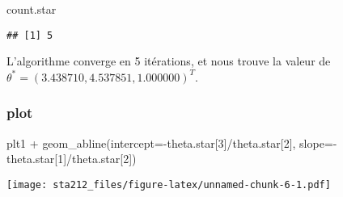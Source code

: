 \documentclass[
]{article}
\newenvironment{Shaded}{\begin{snugshade}}{\end{snugshade}}
\newcommand{\AttributeTok}[1]{\textcolor[rgb]{0.77,0.63,0.00}{#1}}
\newcommand{\DecValTok}[1]{\textcolor[rgb]{0.00,0.00,0.81}{#1}}
\newcommand{\FunctionTok}[1]{\textcolor[rgb]{0.00,0.00,0.00}{#1}}
\newcommand{\NormalTok}[1]{#1}
\newcommand{\SpecialCharTok}[1]{\textcolor[rgb]{0.00,0.00,0.00}{#1}}
\begin{document}
\begin{Shaded}
\begin{Highlighting}[]
\NormalTok{count.star}
\end{Highlighting}
\end{Shaded}

\begin{verbatim}
## [1] 5
\end{verbatim}

L'algorithme converge en 5 itérations, et nous trouve la valeur de
\(\theta^* = (3.438710, 4.537851, 1.000000)^T\).

\hypertarget{plot}{%
\subsubsection{plot}\label{plot}}

\begin{Shaded}
\begin{Highlighting}[]
\NormalTok{plt1 }\SpecialCharTok{+} \FunctionTok{geom\_abline}\NormalTok{(}\AttributeTok{intercept=}\SpecialCharTok{{-}}\NormalTok{theta.star[}\DecValTok{3}\NormalTok{]}\SpecialCharTok{/}\NormalTok{theta.star[}\DecValTok{2}\NormalTok{], }\AttributeTok{slope=}\SpecialCharTok{{-}}\NormalTok{theta.star[}\DecValTok{1}\NormalTok{]}\SpecialCharTok{/}\NormalTok{theta.star[}\DecValTok{2}\NormalTok{])}
\end{Highlighting}
\end{Shaded}

\texttt{[image: sta212\_files/figure-latex/unnamed-chunk-6-1.pdf]}
\end{document}
